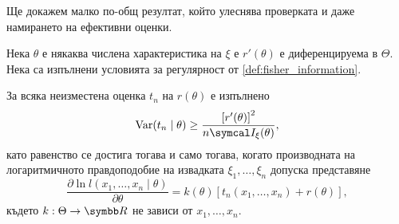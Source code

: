 \documentclass[
  numbers=endperiod,
  headings=standardclasses,
  bibliography=totocnumbered,
]{scrartcl}
\begin{document}
Ще докажем малко по-общ резултат, който улеснява проверката и даже намирането на ефективни оценки.
\begin{theorem}\label{thm:rao_cramer}
  Нека \( \theta \) е някаква числена характеристика на \( \xi \) е \( r'(\theta) \) е диференцируема в \( \Theta \). Нека са изпълнени условията за регулярност от \cref{def:fisher_information}.

  За всяка неизместена оценка \( t_n \) на \( r(\theta) \) е изпълнено
  \begin{equation*}
    \Var(t_n \mid \theta) \geq \frac {{\left[r'(\theta) \right]}^2} {n \FisherInfo_\xi(\theta)},
  \end{equation*}
  като равенство се достига тогава и само тогава, когато производната на логаритмичното правдоподобие на извадката \( \xi_1, \ldots, \xi_n \) допуска представяне
  \begin{equation*}
    \frac {\partial \ln l(x_1, \ldots, x_n \mid \theta)} {\partial \theta}
    =
    k(\theta) [t_n(x_1, \ldots, x_n) + r(\theta)],
  \end{equation*}
  където \( k: \Theta \to \R \) не зависи от \( x_1, \ldots, x_n \).
\end{theorem}
\end{document}
